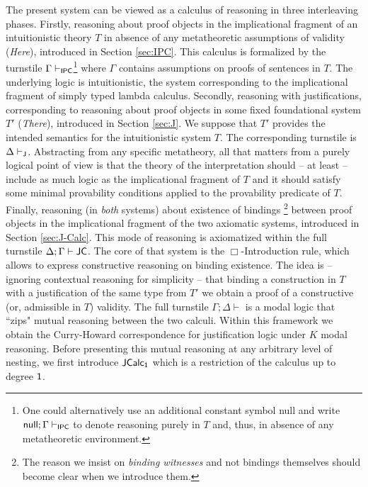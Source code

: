 \documentclass[11pt]{eptcs} %
\begin{document}

The present system can be viewed as a calculus of reasoning in three interleaving phases.
%
Firstly, reasoning about proof objects in the implicational fragment of an intuitionistic theory $T$ in absence of any metatheoretic assumptions of validity (\textit{Here}), introduced in Section \ref{sec:IPC}. This calculus is formalized by the turnstile $\Gamma\vdash_{\sf IPC}$\footnote{One could alternatively use an additional constant symbol {\sf null} and write ${\sf null};\Gamma\vdash_{\sf IPC}$ to denote reasoning  purely in $T$ and, thus, in absence of any metatheoretic environment.}  where $\Gamma$ contains assumptions on proofs of sentences in $T$. The underlying logic is intuitionistic, the system corresponding to the implicational fragment of  simply typed lambda calculus.
%
Secondly, reasoning with justifications, corresponding to reasoning  about proof objects in some fixed foundational system $T'$ (\textit{There}), introduced in Section \ref{sec:J}. We suppose that $T'$ provides the intended semantics for the intuitionistic system $T$. The corresponding turnstile is $\Delta \vdash_{\sf J}$. Abstracting from any specific metatheory, all that matters  from a  purely logical point of view is that the theory of the interpretation should -- at least -- include as much logic as the implicational fragment of $T$ and it should satisfy  some minimal provability conditions applied to  the  provability predicate  of $T$. 
%
Finally, reasoning (in \textit{both} systems) about existence of bindings \footnote{The reason we insist on \textit{binding witnesses} and not bindings themselves should become clear when we introduce them.} between proof objects in the implicational fragment of the two axiomatic systems, introduced in Section \ref{sec:J-Calc}. This mode of reasoning is axiomatized within the full turnstile $\Delta;\Gamma\vdash{\sf JC}$. The core of that system is  the $\Box$-Introduction rule, which allows to express constructive reasoning on binding existence. The idea is -- ignoring contextual reasoning for simplicity -- that binding a construction in $T$ with a justification of the same type from $T'$ we obtain a proof of a constructive (or, admissible in $T$) validity.  
The full turnstile $\Gamma; \Delta\vdash$ is a modal logic that ``zips" mutual reasoning between the two calculi. Within this framework we obtain the Curry-Howard correspondence for justification logic under $K$ modal reasoning. Before presenting this mutual reasoning at any arbitrary level of nesting, we first introduce ${\sf JCalc_1}$ which is a restriction of the calculus up to degree ${\sf 1}$.
\end{document}
